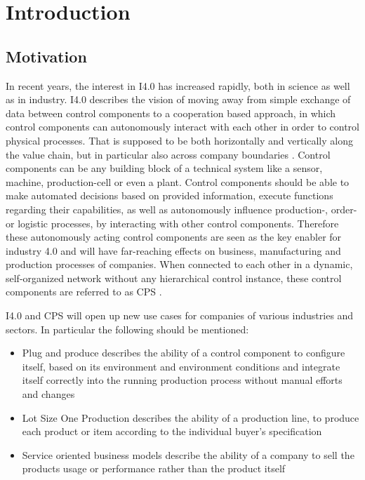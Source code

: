 \chapter{Introduction}

\section{Motivation}
In recent years, the interest in \ac{I4.0} has increased rapidly, both in science as well as in industry. I4.0 describes the vision of moving away from simple exchange of data between control components to a cooperation based approach, in which control components can autonomously interact with each other in order to control physical processes. That is supposed to be both horizontally and vertically along the value chain, but in particular also across company boundaries \cite{Acatech2013} \cite{}. Control components can be any building block of a technical system like a sensor, machine, production-cell or even a plant. Control components should be able to make automated decisions based on provided information, execute functions regarding their capabilities, as well as autonomously influence production-, order- or logistic processes, by interacting with other control components. Therefore these autonomously acting control components are seen as the key enabler for industry 4.0 and will have far-reaching effects on business, manufacturing and production processes of companies. When connected to each other in a dynamic, self-organized network without any hierarchical control instance, these control components are referred to as \ac{CPS} \cite{Lee2008}.

\ac{I4.0} and \ac{CPS} will open up new use cases for companies of various industries and sectors. In particular the following should be mentioned:
\begin{itemize}
    \item Plug and produce describes the ability of a control component to configure itself, based on its environment and environment conditions and integrate itself correctly into the running production process without manual efforts and changes \cite{Schleipen2015} \cite{Ye2020}
    \item Lot Size One Production describes the ability of a production line, to produce each product or item according to the individual buyer's specification
    \item Service oriented business models describe the ability of a company to sell the products usage or performance rather than the product itself \cite{Bendig2021}
\end{itemize}

